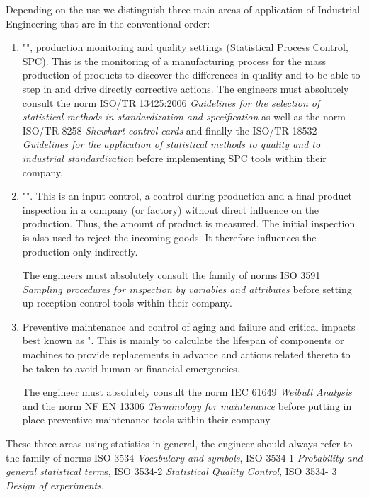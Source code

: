 Depending on the use we distinguish three main areas of application of Industrial Engineering that are in the conventional order:
\begin{enumerate}
	\item "", production monitoring and quality settings (Statistical Process Control, SPC). This is the monitoring of a manufacturing process for the mass production of products to discover the differences in quality and to be able to step in and drive directly corrective actions.
	The engineers must absolutely consult the norm ISO/TR 13425:2006 \textit{Guidelines for the selection of statistical methods in standardization and specification} as well as the norm ISO/TR 8258 \textit{Shewhart control cards} and finally the ISO/TR 18532 \textit{Guidelines for the application of statistical methods to quality and to industrial standardization} before implementing SPC tools within their company.
	\item "". This is an input control, a control during production and a final product inspection in a company (or factory) without direct influence on the production. Thus, the amount of product is measured. The initial inspection is also used to reject the incoming goods. It therefore influences the production only indirectly.
	
The engineers must absolutely consult the family of norms ISO 3591 \textit{Sampling procedures for inspection by variables and attributes} before setting up reception control tools within their company.
	\item Preventive maintenance and control of aging and failure and critical impacts best known as ". This is mainly to calculate the lifespan of components or machines to provide replacements in advance and actions related thereto to be taken to avoid human or financial emergencies.
	
	The engineer must absolutely consult the norm IEC 61649 \textit{Weibull Analysis} and the norm NF EN 13306 \textit{Terminology for maintenance} before putting in place preventive maintenance tools within their company.
\end{enumerate}

These three areas using statistics in general, the engineer should always refer to the family of norms ISO 3534 \textit{Vocabulary and symbols}, ISO 3534-1 \textit{Probability and general statistical term}s, ISO 3534-2 \textit{Statistical Quality Control}, ISO 3534- 3 \textit{Design of experiments}.

